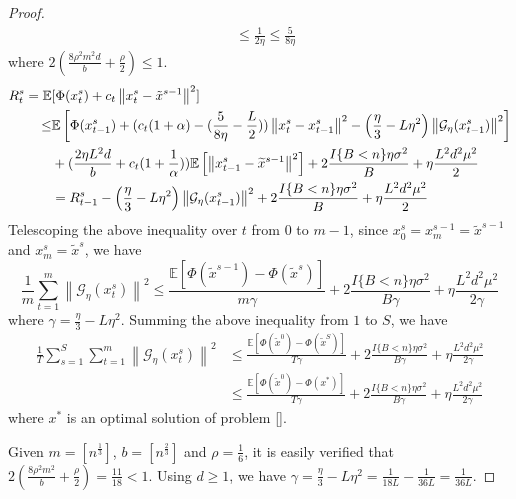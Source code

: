 \documentclass{article}
\newcommand*{\G}{\mathcal{G}}
\newcommand*{\E}{\mathbb{E}}
\newcommand{\norm}[1]{\left\lVert#1\right\rVert}
\theoremstyle{definition}
\theoremstyle{remark}
\begin{document}
\begin{proof}
{{\begin{equation}
\begin{split}
 & \leq \frac{1}{2\eta} \leq \frac{5}{ 8 \eta}
 \end{split}
 \end{equation}
 where $2 (\frac{8\rho^2 m^2 d}{b} + \frac{\rho}{2}) \leq 1$.
 \begin{equation}
  \begin{split} 
R_t^s = \E&[\Phi({x}_{t}^s) + c_t \norm{x_{t}^s - \tilde{x}^{s-1}}^2] \notag\\
\leq & \E\left[\Phi({x}_{t-1}^s)  + (c_t (1+{\alpha})-(\frac{5}{8\eta} - \frac{L}{2}))\norm{{x}_t^s-x_{t-1}^s}^2- \left(\frac{\eta}{3}-L\eta^2\right)\norm{\G_{\eta}(x_{t-1}^s)}^2 \right] \\
 & + (\frac{2\eta L^2 d}{b}+c_t (1+\frac{1}{\alpha}))\E\left[\norm{x_{t-1}^s-\widetilde{x}^{s-1}}^2\right]+ 2\frac{I\{B < n\}\eta \sigma ^2}{B}+\eta \frac{L^2 d^2 \mu^2}{2}\\
 & = R_{t-1}^s- \left(\frac{\eta}{3}-L\eta^2\right)\norm{\G_{\eta}(x_{t-1}^s)}^2+ 2\frac{I\{B < n\}\eta \sigma ^2}{B}+\eta \frac{L^2 d^2 \mu^2}{2}
 \end{split}
 \end{equation}
 Telescoping the above inequality over $t$ from $0$ to $m-1$, since $x_0^s = x_m^{s-1} = \tilde{x}^{s-1}$ and $x_m^s = \tilde{x}^s$, we have 
 \begin{equation}
 \frac{1}{m}\sum_{t=1}^m\norm{\G_{\eta}(x_{t}^s)}^2 \leq \frac{\E[\Phi(\tilde{x}^{s-1}) - \Phi(\tilde{x}^s)]}{m\gamma}+2\frac{I\{B < n\}\eta \sigma ^2}{B\gamma}+\eta \frac{L^2 d^2 \mu^2}{2\gamma}
 \end{equation}
 where $\gamma = \frac{\eta}{3}-L\eta^2$. Summing the above inequality from $1$ to $S$, we have 
  \begin{equation}
  \begin{split}
 \frac{1}{T}\sum_{s=1}^S\sum_{t=1}^m\norm{\G_{\eta}(x_{t}^s)}^2 & \leq \frac{\E[\Phi(\tilde{x}^{0}) - \Phi(\tilde{x}^S)]}{T\gamma}+2\frac{I\{B < n\}\eta \sigma ^2}{B\gamma}+\eta \frac{L^2 d^2 \mu^2}{2\gamma}\\
 & \leq \frac{\E[\Phi(\tilde{x}^{0}) - \Phi({x}^*)]}{T\gamma}+2\frac{I\{B < n\}\eta \sigma ^2}{B\gamma}+\eta \frac{L^2 d^2 \mu^2}{2\gamma}
 \end{split}
 \end{equation}
 where $x^*$ is an optimal solution of problem \eqref{}. 
 
 Given $m = [n^{\frac{1}{3}}]$, $b = [n^{\frac{2}{3}}]$ and 
 $\rho = \frac{1}{6}$, it is easily verified that $2 (\frac{8\rho^2 m^2}{b} + \frac{\rho}{2}) = \frac{11}{18} < 1$. Using $d \geq 1$, we have $\gamma = \frac{\eta}{3}-L\eta^2 = \frac{1}{18 L} - \frac{1}{36 L} = \frac{1}{36 L}$.
 }
 }
 

\end{proof}
\end{document}
